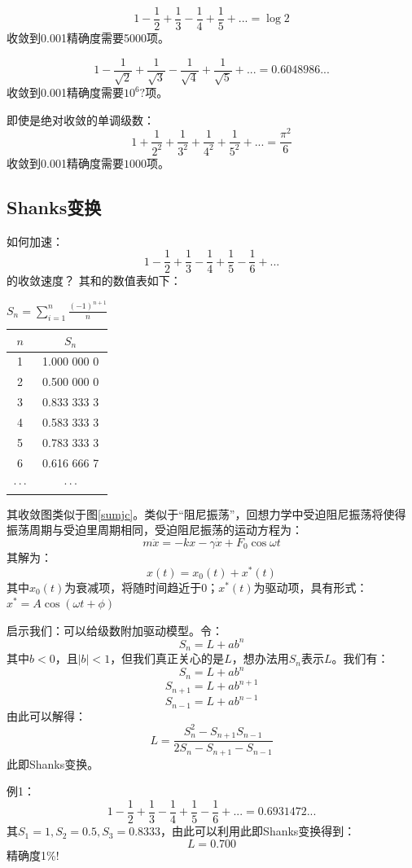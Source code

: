 \[1-\frac{1}{2}+\frac{1}{3}-\frac{1}{4}+\frac{1}{5}+... = \log 2\]
收敛到0.001精确度需要5000项。

\[1-\frac{1}{\sqrt{2}}+\frac{1}{\sqrt{3}}-\frac{1}{\sqrt{4}}+\frac{1}{\sqrt{5}}+... = 0.6048986...\]
收敛到0.001精确度需要$10^6?$项。

即使是绝对收敛的单调级数：
\[1+\frac{1}{2^2}+\frac{1}{3^2}+\frac{1}{4^2}+\frac{1}{5^2}+... = \frac{\pi^2}{6}\]
收敛到0.001精确度需要$1000$项。

\subsection{Shanks变换}
\label{st}

如何加速：
\[1-\frac{1}{2}+\frac{1}{3}-\frac{1}{4}+\frac{1}{5}-\frac{1}{6}+...\]
的收敛速度？
其和的数值表如下：\\
\begin{table}[H]
	\centering
	\begin{tabular}{c|c}
		$n$  &  $S_n$\\
		\hline
		1    & 1.000 000 0\\
		2    & 0.500 000 0\\
		3    & 0.833 333 3\\
		4    & 0.583 333 3\\
		5    & 0.783 333 3\\
		6    & 0.616 666 7\\
		$\cdot\cdot\cdot$  & $\cdot\cdot\cdot$ 
	\end{tabular}
	\caption{$S_n=\sum_{i=1}^{n}\frac{(-1)^{n+1}}{n}$}
\end{table}
其收敛图类似于图\ref{sumjc}。类似于“阻尼振荡”，回想力学中受迫阻尼振荡将使得振荡周期与受迫里周期相同，受迫阻尼振荡的运动方程为：
\[m \ddot{x} = -kx -\gamma \dot{x} +F_0 \cos\omega t\]
其解为：
\[x(t) = x_0(t) +x^*(t) \]
其中$ x_0(t)$为衰减项，将随时间趋近于0；$x^*(t)$为驱动项，具有形式：$x^* = A\cos(\omega t + \phi)$

启示我们：可以给级数附加驱动模型。令：
\[S_n = L +a b^n\]
其中$b<0$，且$|b|<1$，但我们真正关心的是$L$，想办法用$S_n$表示$L$。我们有：
\[S_n = L +a b^n\]
\[S_{n+1} = L +a b^{n+1}\]
\[S_{n-1} = L +a b^{n-1}\]
由此可以解得：
\[L = \frac{S_n^2-S_{n+1}S_{n-1}}{2S_n-S_{n+1}-S_{n-1}}\]
此即Shanks变换。

例1：
\[1-\frac{1}{2}+\frac{1}{3}-\frac{1}{4}+\frac{1}{5}-\frac{1}{6}+... = 0.6931472...\]
其$S_1=1,S_2=0.5,S_3=0.8333$，由此可以利用此即Shanks变换得到：
\[L = 0.700\]
精确度1\%!


